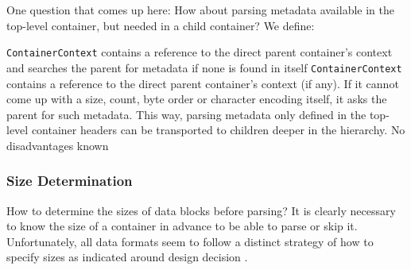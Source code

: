 One question that comes up here: How about parsing metadata available in the top-level container, but needed in a child container? We define:

{%
\texttt{ContainerContext} contains a reference to the direct parent container's context and searches the parent for metadata if none is found in itself
}
{%
\texttt{ContainerContext} contains a reference to the direct parent container's context (if any). If it cannot come up with a size, count, byte order or character encoding itself, it asks the parent for such metadata.
}
{%
This way, parsing metadata only defined in the top-level container headers can be transported to children deeper in the hierarchy.
}
{%
No disadvantages known
}

\subsubsection{Size Determination}%
\label{sec:SizeDetermination}%

How to determine the sizes of data blocks before parsing? It is clearly necessary to know the size of a container in advance to be able to parse or skip it. Unfortunately, all data formats seem to follow a distinct strategy of how to specify sizes as indicated around design decision .

